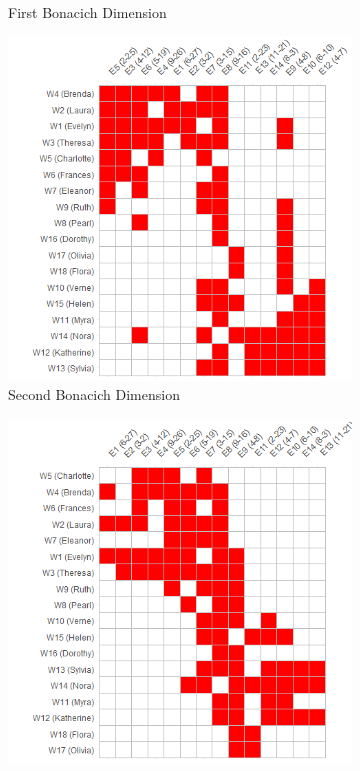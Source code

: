 \documentclass[a4paper,fleqn]{cas-sc}
\begin{document}
\begin{figure}[ht!]
\begin{subfigure}[b]{0.45\textwidth}
            \caption{First Bonacich Dimension}
            \label{fig:bon-reord1}
    \end{subfigure}
     \begin{subfigure}[b]{0.45\textwidth}
        \includegraphics[width=1.0\textwidth]{Plots/bon-reord2.png}
            \caption{Second Bonacich Dimension}
            \label{fig:bon-reord2}
    \end{subfigure}
     \begin{subfigure}[b]{0.45\textwidth}
        \includegraphics[width=1.0\textwidth]{Plots/SR-reord1.png}

\end{subfigure}
\end{figure}
\end{document}
